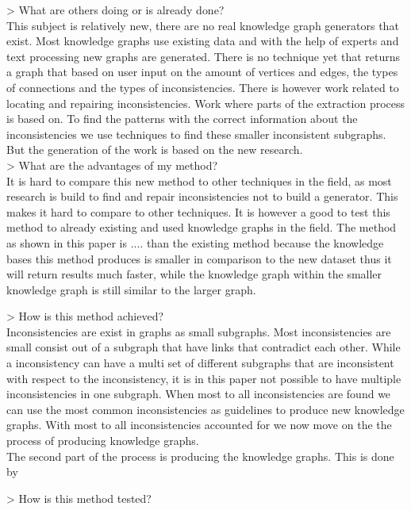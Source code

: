 \documentclass{article}
\begin{document}
> What are others doing or is already done?\\
This subject is relatively new, there are no real knowledge graph generators that exist. Most knowledge graphs use existing data and with the help of experts and text processing new graphs are generated. There is no technique yet that returns a graph that based on user input on the amount of vertices and edges, the types of connections and the types of inconsistencies. There is however work related to locating and repairing inconsistencies. Work where parts of the extraction process is based on. To find the patterns with the correct information about the inconsistencies we use techniques to find these smaller inconsistent subgraphs. But the generation of the work is based on the new research.\\

> What are the advantages of my method?\\
It is hard to compare this new method to other techniques in the field, as most research is build to find and repair inconsistencies not to build a generator. This makes it hard to compare to other techniques. It is however a good to test this method to already existing and used knowledge graphs in the field. The method as shown in this paper is .... than the existing method because the knowledge bases this method produces is smaller in comparison to the new dataset thus it will return results much faster, while the knowledge graph within the smaller knowledge graph is still similar to the larger graph.

> How is this method achieved?\\
Inconsistencies are exist in graphs as small subgraphs. Most inconsistencies are small consist out of a subgraph that have links that contradict each other. While a inconsistency can have a multi set of different subgraphs that are inconsistent with respect to the inconsistency, it is in this paper not possible to have multiple inconsistencies in one subgraph. When most to all inconsistencies are found we can use the most common inconsistencies as guidelines to produce new knowledge graphs. With most to all inconsistencies accounted for we now move on the the process of producing knowledge graphs. \\
The second part of the process is producing the knowledge graphs. This is done by %

> How is this method tested?\\
\end{document}
